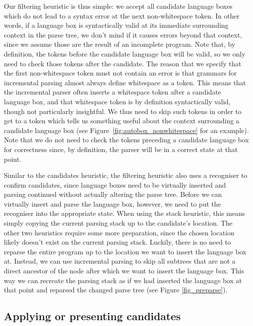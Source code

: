 \documentclass[sigplan,screen]{acmart}\settopmatter{printfolios=true,printccs=false,printacmref=false}
\begin{document}
Our filtering heuristic is thus simple: we accept all candidate language
boxes which do not lead to a syntax error at the next non-whitespace token. In other
words, if a language box is syntactically valid at its immediate surrounding
context in the parse tree, we don't mind if it causes errors beyond that
context, since we assume those are the result of an
incomplete program. Note that, by definition, the tokens before the candidate
language box will be valid, so we only need to check those tokens after the
candidate. The reason that we specify that the first non-whitespace
token must not contain an error is that grammars for incremental parsing almost
always define whitespace as a token. This means that the incremental parser
often inserts a whitespace token after a candidate language box, and that
whitespace token is by definition syntactically valid, though not particularly
insightful. We thus need to skip such tokens in order to get to a
token which tells us something useful about the context surrounding a candidate
language box (see Figure~\ref{fig:autobox_nonwhitespace} for an example).
Note that we do not need to check the tokens preceding a candidate language box
for correctness since, by definition, the parser will be in a correct state
at that point.

Similar to the candidates heuristic, the filtering heuristic also uses a
recogniser to confirm candidates, since language boxes need to be virtually
inserted and parsing continued without actually altering the parse tree. Before
we can virtually insert and parse the language box, however, we need to put the
recogniser into the appropriate state. When using the stack heuristic, this
means simply copying the current parsing stack up to the candidate's location.
The other two heuristics require some more preparation, since the chosen
location likely doesn't exist on the current parsing stack. Luckily, there is
no need to reparse the entire program up to the location we want to insert the
language box at. Instead, we can use incremental parsing to skip all subtrees
that are not a direct ancestor of the node after which we want to insert the
language box. This way we can recreate the parsing stack as if we had inserted
the language box at that point and reparsed the changed parse tree (see Figure
\ref{fig_preparse}).


\subsection{Applying or presenting candidates}
\label{applying and presenting}
\end{document}
